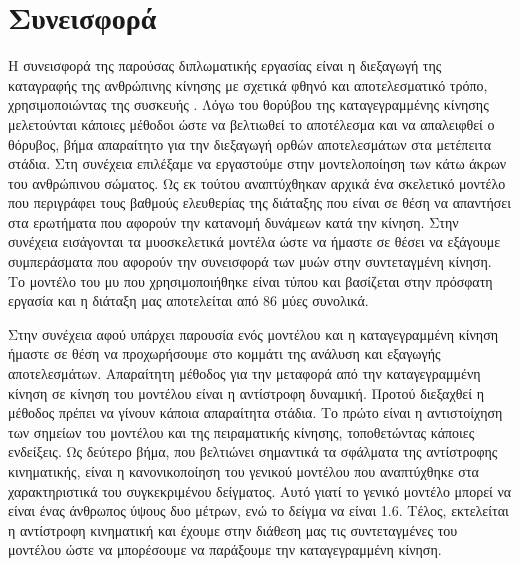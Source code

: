 \section{Συνεισφορά}

Η συνεισφορά της παρούσας διπλωματικής εργασίας είναι η διεξαγωγή της καταγραφής της ανθρώπινης κίνησης με σχετικά φθηνό και αποτελεσματικό τρόπο, χρησιμοποιώντας της συσκευής . Λόγω του θορύβου της καταγεγραμμένης κίνησης μελετούνται κάποιες μέθοδοι ώστε να βελτιωθεί το αποτέλεσμα και να απαλειφθεί ο θόρυβος, βήμα απαραίτητο για την διεξαγωγή ορθών αποτελεσμάτων στα μετέπειτα στάδια. Στη συνέχεια επιλέξαμε να εργαστούμε στην μοντελοποίηση των κάτω άκρων του ανθρώπινου σώματος. Ως εκ τούτου αναπτύχθηκαν αρχικά ένα σκελετικό μοντέλο που περιγράφει τους βαθμούς ελευθερίας της διάταξης που είναι σε θέση να απαντήσει στα ερωτήματα που αφορούν την κατανομή δυνάμεων κατά την κίνηση. Στην συνέχεια εισάγονται τα μυοσκελετικά μοντέλα ώστε να ήμαστε σε θέσει να εξάγουμε συμπεράσματα που αφορούν την συνεισφορά των μυών στην συντεταγμένη κίνηση. Το μοντέλο του μυ που χρησιμοποιήθηκε είναι τύπου  και βασίζεται στην πρόσφατη εργασία \cite{millard13} και η διάταξη μας αποτελείται από 86 μύες συνολικά.

Στην συνέχεια αφού υπάρχει παρουσία ενός μοντέλου και η καταγεγραμμένη κίνηση ήμαστε σε θέση να προχωρήσουμε στο κομμάτι της ανάλυση και εξαγωγής αποτελεσμάτων. Απαραίτητη μέθοδος για την μεταφορά από την καταγεγραμμένη κίνηση σε κίνηση του μοντέλου είναι η αντίστροφη δυναμική. Προτού διεξαχθεί η μέθοδος πρέπει να γίνουν κάποια απαραίτητα στάδια. Το πρώτο είναι η αντιστοίχηση των σημείων του μοντέλου και της πειραματικής κίνησης, τοποθετώντας κάποιες ενδείξεις. Ως δεύτερο βήμα, που βελτιώνει σημαντικά τα σφάλματα της αντίστροφης κινηματικής, είναι η κανονικοποίηση του γενικού μοντέλου που αναπτύχθηκε στα χαρακτηριστικά του συγκεκριμένου δείγματος. Αυτό γιατί το γενικό μοντέλο μπορεί να είναι ένας άνθρωπος ύψους δυο μέτρων, ενώ το δείγμα να είναι 1.6. Τέλος, εκτελείται η αντίστροφη κινηματική και έχουμε στην διάθεση μας τις συντεταγμένες του μοντέλου ώστε να μπορέσουμε να παράξουμε την καταγεγραμμένη κίνηση.

